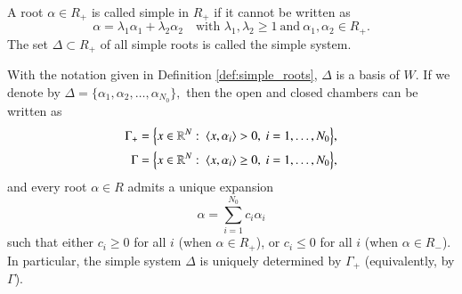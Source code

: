 \documentclass[12pt]{amsart}
\begin{document}
\begin{definition}{\rm \cite[Definition~2.9]{HeckmanCoxeterGroups}}\label{def:simple_roots}
A root $\alpha\in R_{+}$
is called simple in $R_{+}$ if it cannot be written as
\[
\alpha=\lambda_{1}\alpha_{1}+\lambda_{2}\alpha_{2}
\quad\text{with }\lambda_{1},\lambda_{2}\ge 1\ \text{and}\ \alpha_{1},\alpha_{2}\in R_{+}.
\]
The set $\Delta\subset R_{+}$ of all simple roots is called the
simple system.
\end{definition}

\begin{lemma}\label{lem:simple_system_associated_to_chamber}
With the notation given in Definition \ref{def:simple_roots},  $\Delta$ is a basis of $W$. If we denote by
$
\Delta=\{\alpha_{1},\alpha_{2},\ldots,\alpha_{N_{0}}\},
$
then the open and closed chambers can be written as
\begin{align}
\Gamma_{+}
&=\Bigl\{x\in\mathbb{R}^{N}:\ \langle x,\alpha_{i}\rangle>0,\ i=1,\ldots,N_{0}\Bigr\},
\label{eq:open_chamber_by_simple_roots}\\
\Gamma
&=\Bigl\{x\in\mathbb{R}^{N}:\ \langle x,\alpha_{i}\rangle\ge 0,\ i=1,\ldots,N_{0}\Bigr\},
\label{eq:closed_chamber_by_simple_roots}
\end{align}
and every root $\alpha\in R$ admits a unique expansion
\[
\alpha=\sum_{i=1}^{N_{0}}c_{i}\alpha_{i}
\]
such that either $c_{i}\ge 0$ for all $i$ (when $\alpha\in R_{+}$), or $c_{i}\le 0$ for all $i$
(when $\alpha\in R_{-}$). In particular, the simple system $\Delta$ is uniquely determined by $\Gamma_{+}$
(equivalently, by $\Gamma$).
\end{lemma}
\end{document}
